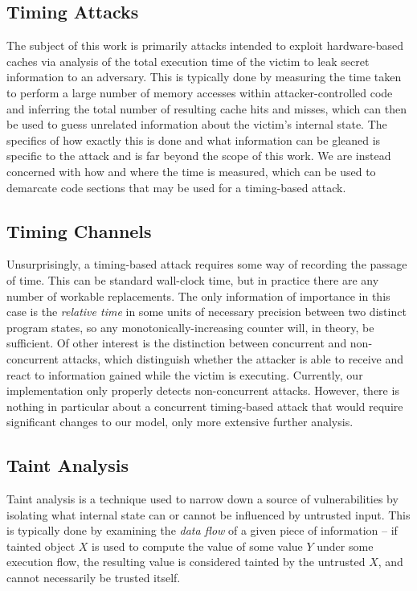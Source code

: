 \documentclass[12pt]{article}
\begin{document}
\begin{multicols*}{2}
  \subsection{Timing Attacks}

  The subject of this work is primarily attacks intended to exploit
  hardware-based caches via analysis of the total execution time of the victim
  to leak secret information to an adversary\cite{Ge2018}. This is typically
  done by measuring the time taken to perform a large number of memory accesses
  within attacker-controlled code and inferring the total number of resulting
  cache hits and misses, which can then be used to guess unrelated information
  about the victim's internal state. The specifics of how exactly this is done
  and what information can be gleaned is specific to the attack and is far
  beyond the scope of this work. We are instead concerned with how and where
  the time is measured, which can be used to demarcate code sections that may
  be used for a timing-based attack.

  \subsection{Timing Channels}

  Unsurprisingly, a timing-based attack requires some way of recording the
  passage of time. This can be standard wall-clock time, but in practice there
  are any number of workable replacements. The only information of importance
  in this case is the \textit{relative time} in some units of necessary
  precision between two distinct program states, so any
  monotonically-increasing counter will, in theory, be sufficient\cite{Ge2018}.
  Of other interest is the distinction between
  concurrent and non-concurrent attacks, which distinguish whether the attacker
  is able to receive and react to information gained while the victim is
  executing\cite{lcache}. Currently, our implementation only properly
  detects non-concurrent attacks. However, there is nothing in particular about
  a concurrent timing-based attack that would require significant changes to
  our model, only more extensive further analysis.

  \subsection{Taint Analysis}

  Taint analysis is a technique used to narrow down a source of vulnerabilities
  by isolating what internal state can or cannot be influenced by untrusted
  input. This is typically done by examining the \textit{data flow} of a given
  piece of information -- if tainted object $X$ is used to compute the value of
  some value $Y$ under some execution flow, the resulting value is considered
  tainted by the untrusted $X$, and cannot necessarily be trusted
  itself\cite{taint}.


\end{multicols*}
\end{document}
